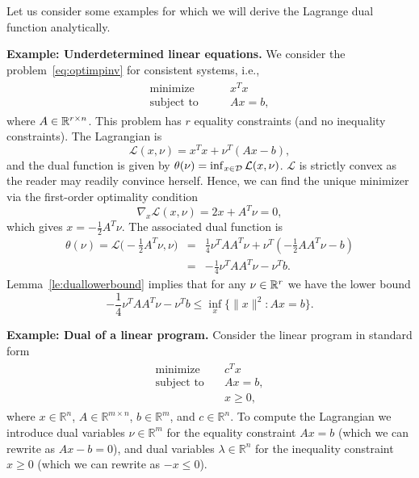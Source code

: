 Let us consider some examples for which we will derive the Lagrange dual function analytically.

\noindent
\textbf{Example: Underdetermined linear equations.}
We consider the problem~\eqref{eq:optimpinv} for consistent systems, i.e.,
\begin{align}\label{eq:optimpinv2}
\begin{split}
 \text{minimize} & \qquad   x^T x  \\
 \text{subject to} & \qquad Ax = b,
\end{split}
\end{align}
where $A \in \mathbb{R}^{r \times n}$. This problem has $r$ equality constraints (and no inequality constraints).
The Lagrangian is 
$$ \mathcal{L}(x,\nu) = x^T x + \nu^T (Ax-b),$$ 
and the dual function is given by $\theta(\nu) = \inf_{x \in {\mathcal D}} \mathcal{L}(x,\nu)$. $\mathcal{L}$ is strictly convex as the reader may readily convince herself. Hence, we can find the unique minimizer via the first-order optimality condition 
$$\nabla_x \mathcal{L}(x,\nu) = 2x + A^T \nu = 0,$$
which gives $x = - \frac{1}{2} A^T \nu$.  The associated dual function is 
\begin{eqnarray*}\theta(\nu) =  \mathcal{L}\big(- \frac{1}{2} A^T \nu,\nu\big) &=& 
 \frac{1}{4} \nu^T A A^T \nu  + \nu^T ( -\frac{1}{2}A  A^T\nu - b)\\
&=&
-\frac{1}{4} \nu^T A A^T \nu  - \nu^T b.
\end{eqnarray*}
Lemma~\ref{le:duallowerbound} implies that for any $\nu \in \mathbb{R}^r$ we have the lower bound
$$ -\frac{1}{4} \nu^T A A^T \nu  - \nu^T b \le 
\inf_x \big\{\|x\|^2: Ax = b\big\}.$$


\medskip
\noindent
\textbf{Example: Dual of a linear program.}
Consider the linear program in standard form
\begin{align}\label{LPstandard}
\begin{split}
\text{minimize} \quad & c^T x \\
\text{subject to} \quad & Ax = b, \\
& x \ge 0,
\end{split}
\end{align}
where $x \in \mathbb{R}^n$, $A \in \mathbb{R}^{m \times n}$,
$b \in \mathbb{R}^m$, and $c \in \mathbb{R}^n$.
To compute the Lagrangian we introduce dual variables $\nu \in \mathbb{R}^m$ for the equality constraint $Ax=b$ (which we can rewrite as $Ax-b=0$), and
dual variables $\lambda \in \mathbb{R}^n$ for the inequality constraint $x \ge 0$ (which we can rewrite as $-x \le 0$).

